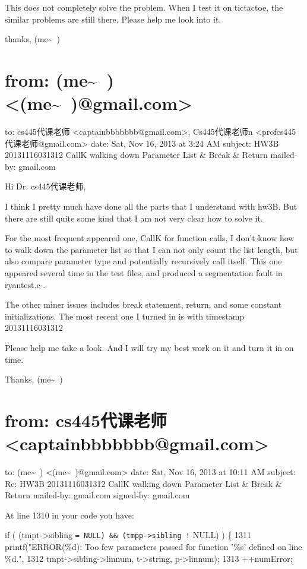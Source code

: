 \documentclass[12pt]{book}
\begin{document}
This does not completely solve the problem. When I test it on tictactoe, the similar problems are still there. 
Please help me look into it. 

thanks,
(me\textasciitilde{}~)

\section{from:         (me\textasciitilde{}~) <(me\textasciitilde{}~)@gmail.com>}
\label{sec-29-4}
to:         cs445代课老师 <captainbbbbbbb@gmail.com>,
 Cs445代课老师n <profcs445代课老师@gmail.com>
date:         Sat, Nov 16, 2013 at 3:24 AM
subject:         HW3B 20131116031312 CallK walking down Parameter List \& Break \& Return
mailed-by:         gmail.com

Hi Dr. cs445代课老师, 

I think I pretty much have done all the parts that I understand with hw3B. But there are still quite some kind that I am not very clear how to solve it. 

For the most frequent appeared one, CallK for function calls, I don't know how to walk down the parameter list so that I can not only count the list length, but also compare parameter type and potentially recursively call itself. This one appeared several time in the test files, and produced a segmentation fault in ryantest.c-. 

The other miner issues includes break statement, return, and some constant initializations. The most recent one I turned in is with timestamp 20131116031312

Please help me take a look. And I will try my best work on it and turn it in on time. 

Thanks,
(me\textasciitilde{}~)

\section{from:         cs445代课老师 <captainbbbbbbb@gmail.com>}
\label{sec-29-5}
to:         (me\textasciitilde{}~) <(me\textasciitilde{}~)@gmail.com>
date:         Sat, Nov 16, 2013 at 10:11 AM
subject:         Re: HW3B 20131116031312 CallK walking down Parameter List \& Break \& Return
mailed-by:         gmail.com
signed-by:         gmail.com

At line 1310 in your code you have:

if ( (tmpt->sibling \texttt{= NULL) \&\&  (tmpp->sibling !} NULL) ) \{
1311                        printf("ERROR(\%d): Too few parameters passed for function '\%s' defined on line \%d.\n", 
1312                               tmpt->sibling->linnum, t->string, p->linnum);
1313                        ++numError;
\end{document}
